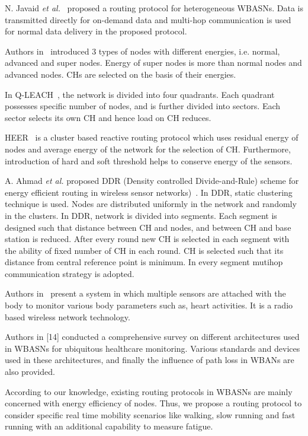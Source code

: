 \documentclass[journal]{IEEEtran}
\begin{document}
N. Javaid \textit{et al.}~\cite{8} proposed a routing protocol for heterogeneous WBASNs. Data is transmitted directly for on-demand data and multi-hop
communication is used for normal data delivery in the proposed protocol.

Authors in~\cite{9} introduced $3$ types of nodes with different energies, i.e. normal, advanced and super nodes. Energy of super nodes is more than normal
nodes and advanced nodes. CHs are selected on the basis of their energies.

In Q-LEACH~\cite{10}, the network is divided into four quadrants. Each quadrant possesses specific number of nodes, and is further divided into sectors.
Each sector selects its own CH and hence load on CH reduces.

HEER~\cite{11} is a cluster based reactive routing protocol which uses residual energy of nodes and average energy of the network for the selection of CH.
Furthermore, introduction of hard and soft threshold helps to conserve energy of the sensors.

A. Ahmad \textit{et al.} proposed DDR (Density controlled Divide-and-Rule) scheme for energy efficient routing in wireless sensor networks)~\cite{12}. In DDR,
static clustering technique is used. Nodes are distributed uniformly in the network and randomly in the clusters. In DDR, network is divided into segments.
Each segment is designed such that distance between CH and nodes, and between CH and base station is reduced. After every round new CH is selected in each
segment with the ability of fixed number of CH in each round. CH is selected such that its distance from central reference point is minimum. In every segment
mutihop communication strategy is adopted.

Authors in~\cite{13} present a system in which multiple sensors are attached with the body to monitor various body parameters such as, heart activities.
It is a radio based wireless network technology.

Authors in [14] conducted a comprehensive survey on different architectures used in WBASNs for ubiquitous healthcare monitoring.
Various standards and devices used in these architectures, and finally the influence of path loss in WBANs are also provided.

According to our knowledge, existing routing protocols in WBASNs  are mainly concerned with energy efficiency of nodes. Thus, we propose a routing
protocol to consider specific real time mobility scenarios like walking, slow running and fast running with an additional capability to measure fatigue.
\end{document}
